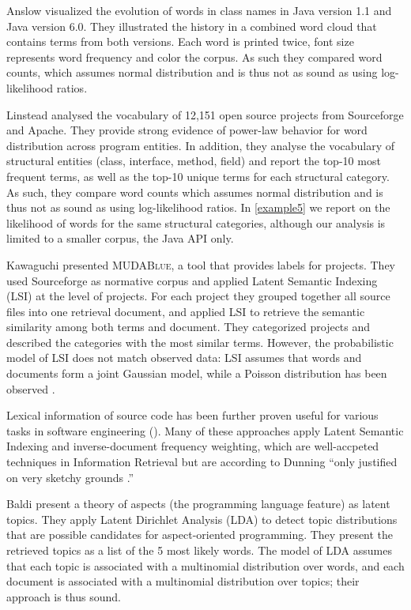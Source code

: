 Anslow \etal \cite{Anslow08OOPSLA} visualized the evolution of words in class names in Java version 1.1 and Java version 6.0. They illustrated the history in a combined word cloud that contains terms from both versions. Each word is printed twice, font size represents word frequency and color the corpus. As such they compared word counts, which assumes normal distribution and is thus not as sound as using log-likelihood ratios.
 
Linstead \etal \cite{Linstead09SUITE} analysed the vocabulary of 12,151 open source projects from Sourceforge and Apache. They provide strong evidence of power-law behavior for word distribution across program entities. In addition, they analyse the vocabulary of structural entities (class, interface, method, field) and report the top-10 most frequent terms, as well as the top-10 unique terms for each structural category. As such, they compare word counts which assumes normal distribution and is thus not as sound as using log-likelihood ratios. In \autoref{example5} we report on the likelihood of words for the same structural categories, although our analysis is limited to a smaller corpus, \ie the Java API only.

Kawaguchi \etal \cite{Kawa04a} presented \textsc{MUDABlue}, a tool that provides labels for projects. They used Sourceforge as normative corpus and applied Latent Semantic Indexing (LSI) at the level of projects.
For each project they grouped together all source files into one retrieval document, and applied LSI to retrieve the semantic similarity among both terms and document.
They categorized projects and described the categories with the most similar terms. However, the probabilistic model of LSI does not match observed data: LSI assumes that words and documents form a joint Gaussian model, while a Poisson distribution has been observed \cite{Hofmann99PLSA}.

Lexical information of source code has been further proven useful for various tasks in software engineering (\eg \cite{Anto02a,Marc05a,Posh09a}). Many of these approaches apply Latent Semantic Indexing and inverse-document frequency weighting, which are well-accpeted techniques in Information Retrieval but are according to Dunning ``only justified on very sketchy grounds \cite{Dunning}.''

Baldi \etal \cite{Bald08a} present a theory of aspects (the programming language feature) as latent topics. They apply Latent Dirichlet Analysis (LDA) to detect topic distributions that are possible candidates for aspect-oriented programming. They present the retrieved topics as a list of the 5 most likely words. The model of LDA assumes that each topic is associated with a multinomial distribution over words, and each document is associated with a multinomial distribution over topics; their approach is thus sound.

